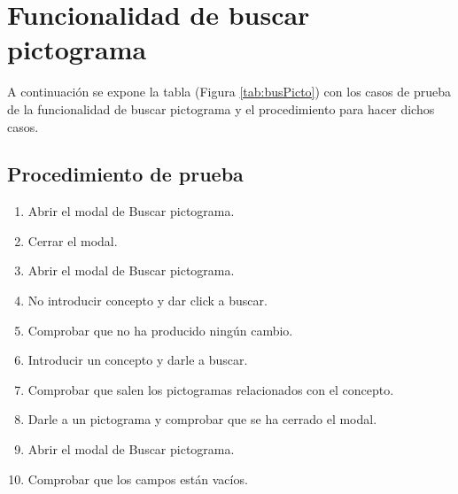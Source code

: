\section{Funcionalidad de buscar pictograma}
\label{planPruebas:busPicto}
A continuación se expone la tabla (Figura \ref{tab:busPicto}) con los casos de prueba de la funcionalidad de buscar pictograma y el procedimiento para hacer dichos casos.

\begin{table}[H]
    \centering
    \caption{Casos de prueba de la funcionalidad de buscar pictograma.}
    \label{tab:busPicto}
\end{table}

\subsection{Procedimiento de prueba}
\label{procedimientoPruebas:busPicto}
\begin{enumerate}
\item Abrir el modal de Buscar pictograma.
\item Cerrar el modal.
\item Abrir el modal de Buscar pictograma.
\item No introducir concepto y dar click a buscar.
\item Comprobar que no ha producido ningún cambio.
\item Introducir un concepto y darle a buscar.
\item Comprobar que salen los pictogramas relacionados con el concepto.
\item Darle a un pictograma y comprobar que se ha cerrado el modal.
\item Abrir el modal de Buscar pictograma.
\item Comprobar que los campos están vacíos.

\end{enumerate}


